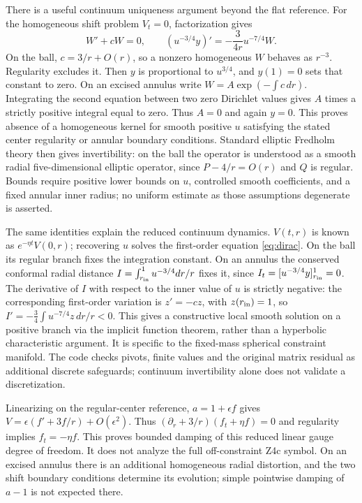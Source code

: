 \documentclass[11pt]{article}
\begin{document}
There is a useful continuum uniqueness argument beyond the flat reference.
For the homogeneous shift problem $V_t=0$, factorization gives
\begin{equation}
 W'+cW=0,\qquad (u^{-3/4}y)'=-\frac{3}{4r}u^{-7/4}W.
 \label{eq:factor}
\end{equation}
On the ball, $c=3/r+O(r)$, so a nonzero homogeneous $W$ behaves as $r^{-3}$.
Regularity excludes it. Then $y$ is proportional to $u^{3/4}$, and $y(1)=0$
sets that constant to zero. On an excised annulus write
$W=A\exp(-\int c\,dr)$. Integrating the second equation between two zero
Dirichlet values gives $A$ times a strictly positive integral equal to zero.
Thus $A=0$ and again $y=0$. This proves absence of a homogeneous kernel for
smooth positive $u$ satisfying the stated center regularity or annular boundary
conditions. Standard elliptic Fredholm theory then gives invertibility: on the
ball the operator is understood as a smooth radial five-dimensional elliptic
operator, since $P-4/r=O(r)$ and $Q$ is regular. Bounds require positive lower
bounds on $u$, controlled smooth coefficients, and a fixed annular inner radius;
no uniform estimate as those assumptions degenerate is asserted.

The same identities explain the reduced continuum dynamics. $V(t,r)$ is known
as $e^{-\eta t}V(0,r)$; recovering $u$ solves the first-order equation
\eqref{eq:dirac}. On the ball its regular branch fixes the integration constant.
On an annulus the conserved conformal radial distance
$I=\int_{r_{\rm in}}^1u^{-3/4}dr/r$ fixes it, since
$I_t=[u^{-3/4}y]_{r_{\rm in}}^1=0$. The derivative of $I$ with respect to the
inner value of $u$ is strictly negative: the corresponding first-order variation
is $z'= -cz$, with $z(r_{\rm in})=1$, so
$I'=-\frac34\int u^{-7/4}z\,dr/r<0$.
This gives a constructive local smooth solution on a positive branch via the
implicit function theorem, rather than a hyperbolic characteristic argument.
It is specific to the fixed-mass spherical constraint manifold. The code checks
pivots, finite values and the original matrix residual as additional discrete
safeguards; continuum invertibility alone does not validate a discretization.

Linearizing on the regular-center reference, $a=1+\epsilon f$ gives
$V=\epsilon(f'+3f/r)+O(\epsilon^2)$. Thus
$(\partial_r+3/r)(f_t+\eta f)=0$ and regularity implies $f_t=-\eta f$.
This proves bounded damping of this reduced linear gauge degree of freedom.
It does not analyze the full off-constraint Z4c symbol. On an excised annulus
there is an additional homogeneous radial distortion, and the two shift boundary
conditions determine its evolution; simple pointwise damping of $a-1$ is not
expected there.
\end{document}

